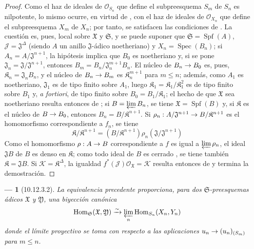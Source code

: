 \documentclass[oneside]{amsart}
\theoremstyle{ega-env-style}
\newtheorem*{env}{---}
\theoremstyle{ega-thm-env-style}
\theoremstyle{ega-defn-env-style}
\def\leq{\leqslant}                 %
\renewcommand{\to}{\mathchoice{\longrightarrow}{\rightarrow}{\rightarrow}{\rightarrow}}
\let\EGAOriginalLabel\label
\renewcommand{\label}[1]{\phantomsection\EGAOriginalLabel{#1}}
\begin{document}
\begin{proof}
Como el haz de ideales de $\mathscr{O}_{S_n}$ que define el subpreesquema $S_m$ de $S_n$ es nilpotente, lo mismo ocurre, en virtud de , con el haz de ideales de $\mathscr{O}_{X_n}$ que define el subpreesquema $X_m$ de $X_n$; por tanto, se satisfacen las condiciones de .
La cuestión es, pues, local sobre $\mathfrak{X}$ y $\mathfrak{S}$, y se puede suponer que $\mathfrak{S}=\operatorname{Spf}(A)$, $\mathscr{J}=\mathfrak{J}^\Delta$ (siendo $A$ un anillo $\mathfrak{J}$-ádico noetheriano) y $X_n=\operatorname{Spec}(B_n)$;
si $A_n=A/\mathfrak{J}^{n+1}$, la hipótesis implica que $B_0$ es noetheriano y, si se pone $\mathfrak{J}_n=\mathfrak{J}/\mathfrak{J}^{n+1}$, entonces $B_m=B_n/\mathfrak{J}_n^{m+1}B_n$.
El núcleo de $B_n\to B_0$ es, pues, $\mathfrak{K}_n=\mathfrak{J}_nB_n$, y el núcleo de $B_n\to B_m$ es $\mathfrak{K}_n^{m+1}$ para $m\leq n$;
además, como $A_1$ es noetheriano, $\mathfrak{J}_1$ es de tipo finito sobre $A_1$, luego $\mathfrak{K}_1=\mathfrak{K}_1/\mathfrak{K}_1^2$ es de tipo finito sobre $B_1$ y, \emph{a fortiori}, de tipo finito sobre $B_0=B_1/\mathfrak{K}_1$;
el hecho de que $\mathfrak{X}$ sea noetheriano resulta entonces de ;
si $B=\varprojlim B_n$, se tiene $\mathfrak{X}=\operatorname{Spf}(B)$ y, si $\mathfrak{K}$ es el núcleo de $B\to B_0$, entonces $B_n=B/\mathfrak{K}^{n+1}$.
Si $\rho_n:A/\mathfrak{J}^{n+1}\to B/\mathfrak{K}^{n+1}$ es el homomorfismo correspondiente a $f_n$, se tiene
\[
  \mathfrak{K}/\mathfrak{K}^{n+1}
  =(B/\mathfrak{K}^{n+1})\rho_n(\mathfrak{J}/\mathfrak{J}^{n+1})
\]
Como el homomorfismo $\rho:A\to B$ correspondiente a $f$ es igual a $\varprojlim\rho_n$, el ideal $\mathfrak{J}B$ de $B$ es denso en $\mathfrak{K}$; como todo ideal de $B$ es cerrado , se tiene también $\mathfrak{K}=\mathfrak{J}B$.
Si $\mathscr{K}=\mathfrak{K}^\Delta$, la igualdad $f^*(\mathscr{J})\mathscr{O}_{\mathfrak{X}}=\mathscr{K}$ resulta entonces de  y termina la demostración.
\end{proof}

\begin{env}[10.12.3.2]
\label{I.10.12.3.2}
La equivalencia precedente proporciona, para dos $\mathfrak{S}$-preesquemas ádicos $\mathfrak{X}$ y $\mathfrak{Y}$, una \emph{biyección canónica}
\[
  \operatorname{Hom}_{\mathfrak{S}}(\mathfrak{X},\mathfrak{Y})
  \xrightarrow{\sim}
  \varprojlim_n\operatorname{Hom}_{S_n}(X_n,Y_n)
\]
donde el límite proyectivo se toma con respecto a las aplicaciones $u_n\to(u_n)_{(S_m)}$ para $m\leq n$.
\end{env}
\end{document}
